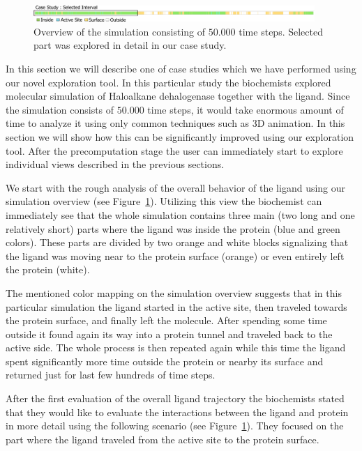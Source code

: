 \documentclass[twocolumn]{bmcart}%
\begin{document}
\begin{figure}[htb]
	\centering
  \includegraphics[width=0.95\textwidth]{img/case_overview.pdf}
  \caption{\label{fig:case_overview} Overview of the simulation consisting of $50.000$ time steps. Selected part was explored in detail in our case study.}
\end{figure}

In this section we will describe one of case studies which we have performed using our novel exploration tool.
In this particular study the biochemists explored molecular simulation of Haloalkane dehalogenase together with the ligand. 
Since the simulation consists of $50.000$ time steps, it would take enormous amount of time to analyze it using only common techniques such as 3D animation.
In this section we will show how this can be significantly improved using our exploration tool.
After the precomputation stage the user can immediately start to explore individual views described in the previous sections.

We start with the rough analysis of the overall behavior of the ligand using our simulation overview (see Figure~\ref{fig:case_overview}).
Utilizing this view the biochemist can immediately see that the whole simulation contains three main (two long and one relatively short) parts where the ligand was inside the protein (blue and green colors).
These parts are divided by two orange and white blocks signalizing that the ligand was moving near to the protein surface (orange) or even entirely left the protein (white).
 
The mentioned color mapping on the simulation overview suggests that in this particular simulation the ligand started in the active site, then traveled towards the protein surface, and finally left the molecule.
After spending some time outside it found again its way into a protein tunnel and traveled back to the active side.
The whole process is then repeated again while this time the ligand spent significantly more time outside the protein or nearby its surface and returned just for last few hundreds of time steps. 

After the first evaluation of the overall ligand trajectory the biochemists stated that they would like to evaluate the interactions between the ligand and protein in more detail using the following scenario (see Figure~\ref{fig:case_overview}). 
They focused on the part where the ligand traveled from the active site to the protein surface. 
\end{document}
